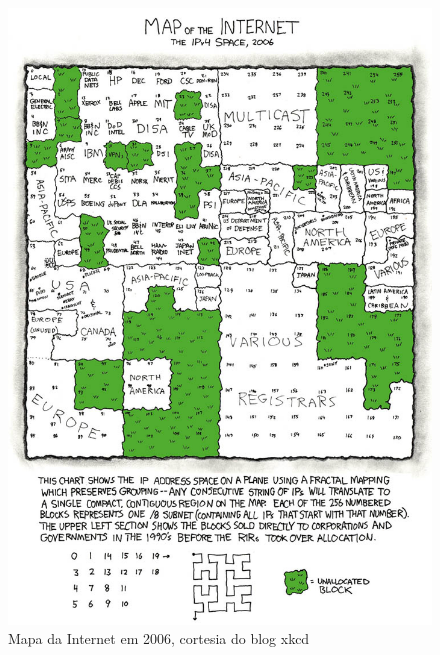 \documentclass[brazil,times]{abnt}
\begin{document}
\begin{figure}[htp]
\begin{center}
  \includegraphics[width=150mm]{imagens/map_of_the_internet.jpg}
  \caption[Mapa da Internet em 2006, cortesia do blog xkcd]{Mapa da Internet em 2006, cortesia do blog xkcd}
  \label{fig:map-intenet}
\end{center}
\end{figure}



\end{document}
